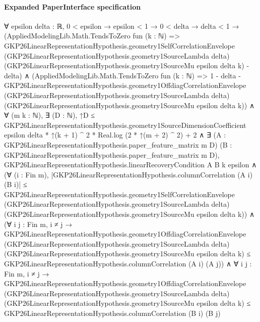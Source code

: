 \documentclass[10pt]{article}
\begin{document}
\paragraph{Expanded PaperInterface specification}
\begin{ReviewVerbatim}
∀ {epsilon delta : ℝ},
  0 < epsilon →
    epsilon < 1 →
      0 < delta →
        delta < 1 →
          (AppliedModelingLib.Math.TendsToZero fun (k : ℕ) =>
              GKP26LinearRepresentationHypothesis.geometry1SelfCorrelationEnvelope
                  (GKP26LinearRepresentationHypothesis.geometry1SourceLambda delta)
                  (GKP26LinearRepresentationHypothesis.geometry1SourceMu epsilon delta k) -
                delta) ∧
            (AppliedModelingLib.Math.TendsToZero fun (k : ℕ) =>
                1 - delta -
                  GKP26LinearRepresentationHypothesis.geometry1OffdiagCorrelationEnvelope
                    (GKP26LinearRepresentationHypothesis.geometry1SourceLambda delta)
                    (GKP26LinearRepresentationHypothesis.geometry1SourceMu epsilon delta k)) ∧
              ∀ (m k : ℕ),
                ∃ (D : ℕ),
                  ↑D ≤
                      GKP26LinearRepresentationHypothesis.geometry1SourceDimensionCoefficient epsilon delta *
                            ↑(k + 1) ^ 2 *
                          Real.log (2 * ↑(m + 2) ^ 2) +
                        2 ∧
                    ∃ (A : GKP26LinearRepresentationHypothesis.paper_feature_matrix m D) (B :
                      GKP26LinearRepresentationHypothesis.paper_feature_matrix m D),
                      GKP26LinearRepresentationHypothesis.linearRecoveryCondition A B k epsilon ∧
                        (∀ (i : Fin m),
                            |GKP26LinearRepresentationHypothesis.columnCorrelation (A i) (B i)| ≤
                              GKP26LinearRepresentationHypothesis.geometry1SelfCorrelationEnvelope
                                (GKP26LinearRepresentationHypothesis.geometry1SourceLambda delta)
                                (GKP26LinearRepresentationHypothesis.geometry1SourceMu epsilon delta k)) ∧
                          (∀ {{i j : Fin m}},
                              i ≠ j →
                                GKP26LinearRepresentationHypothesis.geometry1OffdiagCorrelationEnvelope
                                    (GKP26LinearRepresentationHypothesis.geometry1SourceLambda delta)
                                    (GKP26LinearRepresentationHypothesis.geometry1SourceMu epsilon delta k) ≤
                                  GKP26LinearRepresentationHypothesis.columnCorrelation (A i) (A j)) ∧
                            ∀ {{i j : Fin m}},
                              i ≠ j →
                                GKP26LinearRepresentationHypothesis.geometry1OffdiagCorrelationEnvelope
                                    (GKP26LinearRepresentationHypothesis.geometry1SourceLambda delta)
                                    (GKP26LinearRepresentationHypothesis.geometry1SourceMu epsilon delta k) ≤
                                  GKP26LinearRepresentationHypothesis.columnCorrelation (B i) (B j)
\end{ReviewVerbatim}
\end{document}
